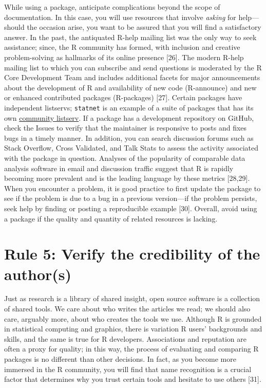 \documentclass[10pt,letterpaper]{article}
\begin{document}
While using a package, anticipate complications beyond the scope of
documentation. In this case, you will use resources that involve
\emph{asking} for help---should the occasion arise, you want to be
assured that you will find a satisfactory answer. In the past, the
antiquated R-help mailing list was the only way to seek assistance;
since, the R community has formed, with inclusion and creative
problem-solving as hallmarks of its online presence {[}26{]}. The modern
R-help mailing list to which you can subscribe and send questions is
moderated by the R Core Development Team and includes additional facets
for major announcements about the development of R and availability of
new code (R-announce) and new or enhanced contributed packages
(R-packages) {[}27{]}. Certain packages have independent listservs;
\texttt{statnet} is an example of a suite of packages that has its own
\href{http://statnet.org/}{community listserv}. If a package has a
development repository on GitHub, check the Issues to verify that the
maintainer is responsive to posts and fixes bugs in a timely manner. In
addition, you can search discussion forums such as Stack Overflow, Cross
Validated, and Talk Stats to assess the activity associated with the
package in question. Analyses of the popularity of comparable data
analysis software in email and discussion traffic suggest that R is
rapidly becoming more prevalent and is the leading language by these
metrics {[}28,29{]}. When you encounter a problem, it is good practice
to first update the package to see if the problem is due to a bug in a
previous version---if the problem persists, seek help by finding or
posting a reproducible example {[}30{]}. Overall, avoid using a package
if the quality and quantity of related resources is lacking.

\hypertarget{rule-5-verify-the-credibility-of-the-authors}{%
\section{Rule 5: Verify the credibility of the
author(s)}\label{rule-5-verify-the-credibility-of-the-authors}}

Just as research is a library of shared insight, open source software is
a collection of shared tools. We care about who writes the articles we
read; we should also care, arguably more, about who creates the tools we
use. Although R is grounded in statistical computing and graphics, there
is variation R users' backgrounds and skills, and the same is true for R
developers. Associations and reputation are often a proxy for quality;
in this way, the process of evaluating and comparing R packages is no
different than other decisions. In fact, as you become more immersed in
the R community, you will find that name recognition is a crucial factor
that determines why you trust certain tools and hesitate to use others
{[}31{]}.
\end{document}
